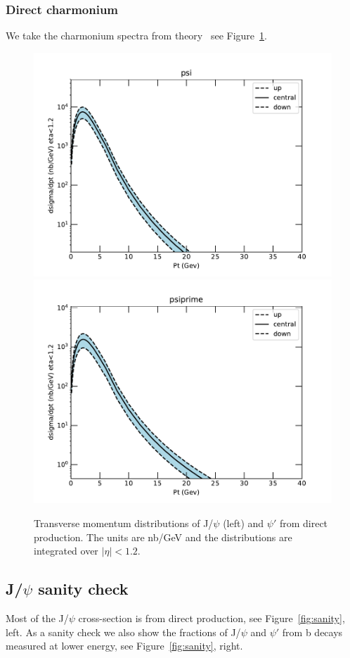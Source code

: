 \documentclass[12pt]{article}
\begin{document}
\subsubsection{Direct charmonium}
\label{sec:psidirect}
We take the charmonium spectra from theory~\cite{Ma:2010yw, Ma:2010jj, Ma:2014mri}
see Figure~\ref{fig:ma}.  

\begin{figure}
\includegraphics[width=0.48\linewidth]{../oniaDirect/CMS-13-TeV/theory/psiLowPt/psiDirect_fullRange.pdf}  
\includegraphics[width=0.48\linewidth]{../oniaDirect/CMS-13-TeV/theory/psiLowPt/psiprimeDirect_fullRange.pdf}  
  \caption{Transverse momentum distributions of J/$\psi$ (left) 
and $\psi'$ from direct production. The units are nb/GeV and the 
distributions 
are integrated over $|\eta|<1.2$.}
  \label{fig:ma}
\end{figure}


\subsection{J/$\psi$ sanity check}

Most of the J/$\psi$ cross-section is from direct production, see
Figure~\ref{fig:sanity}, left.  As a sanity check we also show
the fractions of J/$\psi$ and $\psi'$ from b decays measured
at lower energy, see 
Figure~\ref{fig:sanity}, right\cite{Khachatryan:2010yr}.
\end{document}

